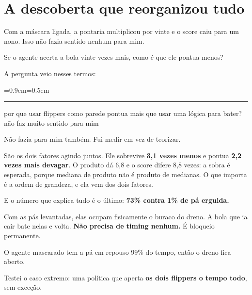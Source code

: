 \documentclass[10pt,a4paper,twoside,twocolumn]{scrartcl}
\renewenvironment{quote}
  {\begin{list}{}{\leftmargin=0.9em\rightmargin=0pt\topsep=0.5em}\item[]%
   \color{destaque}\itshape\small
   \hspace*{-0.9em}\rule[-0.4em]{1.2pt}{1.1em}\hspace{0.5em}\ignorespaces}
  {\end{list}}
\begin{document}
\section{A descoberta que reorganizou
tudo}\label{a-descoberta-que-reorganizou-tudo}

Com a máscara ligada, a pontaria multiplicou por vinte e o score caiu
para um nono. Isso não fazia sentido nenhum para mim.

Se o agente acerta a bola vinte vezes mais, como é que ele pontua menos?

A pergunta veio nesses termos:

\begin{quote}
por que usar flippers como parede pontua mais que usar uma lógica para
bater? não faz muito sentido para mim
\end{quote}

Não fazia para mim também. Fui medir em vez de teorizar.

\vspace{0.2em}
\begin{center}\small
{}
\end{center}
\vspace{0.1em}


São os dois fatores agindo juntos. Ele sobrevive \textbf{3,1 vezes
menos} e pontua \textbf{2,2 vezes mais devagar}. O produto dá 6,8 e o
score difere 8,8 vezes: a sobra é esperada, porque mediana de produto
não é produto de medianas. O que importa é a ordem de grandeza, e ela
vem dos dois fatores.

E o número que explica tudo é o último: \textbf{73\% contra 1\% de pá
erguida.}

Com as pás levantadas, elas ocupam fisicamente o buraco do dreno. A bola
que ia cair bate nelas e volta. \textbf{Não precisa de timing nenhum.} É
bloqueio permanente.

O agente mascarado tem a pá em repouso 99\% do tempo, então o dreno fica
aberto.

Testei o caso extremo: uma política que aperta \textbf{os dois flippers
o tempo todo}, sem exceção.
\end{document}
